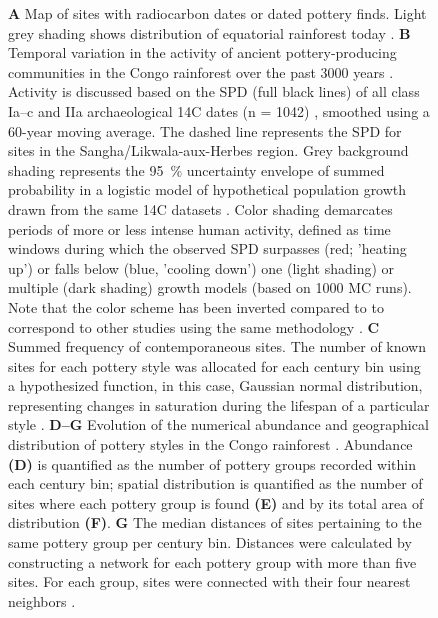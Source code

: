 \documentclass[smallextended,natbib]{svjour3}       %
\begin{document}
\begin{figure}[t!]
	\caption{\textbf{A} Map of sites with radiocarbon dates or dated pottery finds. Light grey shading shows distribution of equatorial rainforest today \citep{White.1983}. \textbf{B} Temporal variation in the activity of ancient pottery-producing communities in the Congo rainforest over the past 3000 years \citep[regions A--H in][Fig.~2]{Seidensticker.2021}. Activity is discussed based on the SPD (full black lines) of all class Ia--c and IIa archaeological 14C dates (n = 1042) \citep{Seidensticker.2021f}, smoothed using a 60-year moving average. The dashed line represents the SPD for sites in the Sangha/Likwala-aux-Herbes region. Grey background shading represents the 95~\% uncertainty envelope of summed probability in a logistic model of hypothetical population growth drawn from the same 14C datasets \citep{Bevan.2022}. Color shading demarcates periods of more or less intense human activity, defined as time windows during which the observed SPD surpasses (red; 'heating up') or falls below (blue, 'cooling down') one (light shading) or multiple (dark shading) growth models (based on 1000 MC runs). Note that the color scheme has been inverted compared to \citep[Fig.~2]{Seidensticker.2021} to correspond to other studies using the same methodology \citep{Crema.2016,Bevan.2017,Riris.2018,Riris.2019a,Brown.2019,Arroyo-Kalin.2021,deSouza.2021}. \textbf{C} Summed frequency of contemporaneous sites. The number of known sites for each pottery style was allocated for each century bin using a hypothesized function, in this case, Gaussian normal distribution, representing changes in saturation during the lifespan of a particular style \citep{Roberts.2012}. \textbf{D--G} Evolution of the numerical abundance and geographical distribution of pottery styles in the Congo rainforest \citep[Fig.~3]{Seidensticker.2021}. Abundance \textbf{(D)} is quantified as the number of pottery groups recorded within each century bin; spatial distribution is quantified as the number of sites where each pottery group is found \textbf{(E)} and by its total area of distribution \textbf{(F)}. \textbf{G} The median distances of sites pertaining to the same pottery group per century bin. Distances were calculated by constructing a network for each pottery group with more than five sites. For each group, sites were connected with their four nearest neighbors \citep{bivand2011spdep}.}
\end{figure}
\end{document}
